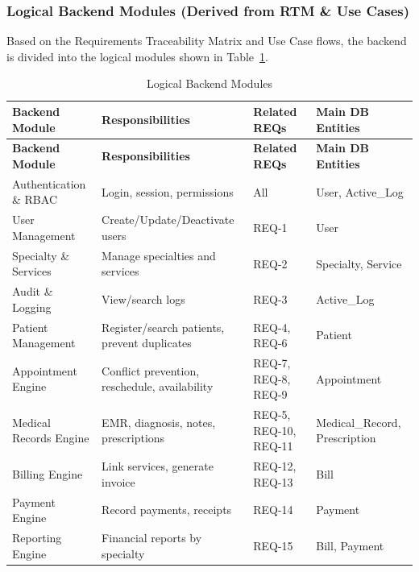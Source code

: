 \subsubsection{Logical Backend Modules (Derived from RTM \& Use Cases)}
Based on the Requirements Traceability Matrix and Use Case flows, the backend is divided into the logical modules shown in Table~\ref{tab:backend-modules}.
\begin{longtable}{%
		p{} 
		p{} 
		p{} 
		p{}}
	
	\caption{Logical Backend Modules}
	\label{tab:backend-modules} \\
	
	\toprule
	\textbf{Backend Module} & \textbf{Responsibilities} & \textbf{Related REQs} & \textbf{Main DB Entities} \\
	\midrule
	\endfirsthead
	
	\toprule
	\textbf{Backend Module} & \textbf{Responsibilities} & \textbf{Related REQs} & \textbf{Main DB Entities} \\
	\midrule
	\endhead
	
	Authentication \& RBAC & Login, session, permissions & All & User, Active\_Log \\[6pt]
	User Management & Create/Update/Deactivate users & REQ-1 & User \\[6pt]
	Specialty \& Services & Manage specialties and services & REQ-2 & Specialty, Service \\[6pt]
	Audit \& Logging & View/search logs & REQ-3 & Active\_Log \\[6pt]
	Patient Management & Register/search patients, prevent duplicates & REQ-4, REQ-6 & Patient \\[6pt]
	Appointment Engine & Conflict prevention, reschedule, availability & REQ-7, REQ-8, REQ-9 & Appointment \\[6pt]
	Medical Records Engine & EMR, diagnosis, notes, prescriptions & REQ-5, REQ-10, REQ-11 & Medical\_Record, Prescription \\[6pt]
	Billing Engine & Link services, generate invoice & REQ-12, REQ-13 & Bill \\[6pt]
	Payment Engine & Record payments, receipts & REQ-14 & Payment \\[6pt]
	Reporting Engine & Financial reports by specialty & REQ-15 & Bill, Payment \\
	
	\bottomrule
\end{longtable}
